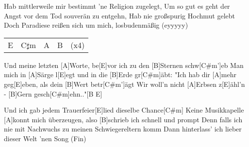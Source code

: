 \begin{guitar}
	Hab mittlerweile mir bestimmt 'ne Religion zugelegt,
	Um so gut es geht der Angst vor dem Tod souverän zu entgehn,
	Hab nie großspurig Hochmut gelebt
	Doch Paradiese reißen sich um mich, losbudenmäßig (eyyyyy)
	
	 
	
	{\footnotesize\begin{tabular}{l|l|l|l l}
			E & C$\sharp$m & A & B & (x4)
	\end{tabular}}
	
	Und meine letzten [A]Worte, be[E]vor ich zu den [B]Sternen schw[C#m']eb
	Man mich in [A]Särge l[E]egt und in die [B]Erde gr[C#m]{ä}bt:
	"Ich hab dir [A]mehr geg[E]eben, als dein [B]Wert betr[C#m']{ä}gt
	Wir woll'n nicht [A]Erbsen z[E]{ä}hl'n - [B]Gern gesch[C#m]ehn.."[B E]{}
	
	Und ich gab jedem Trauerfeier[E]lied dieselbe Chance[C#m]{}
	Keine Musikkapelle [A]konnt mich überzeugen, also [B]schrieb ich schnell und prompt
	Denn falls ich nie mit Nachwuchs zu meinen Schwiegereltern komm
	Dann hinterlass' ich lieber dieser Welt 'nen Song (Fin)
\end{guitar}